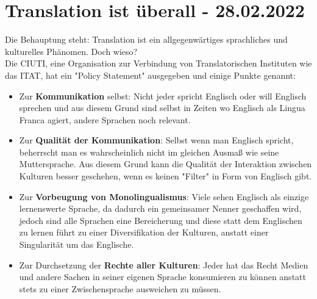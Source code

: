 \documentclass{article}
\begin{document}
	\section{Translation ist überall - 28.02.2022}
	Die Behauptung steht: Translation ist ein allgegenwärtiges sprachliches und kulturelles Phänomen. Doch wieso? \\
	Die CIUTI, eine Organisation zur Verbindung von Translatorischen Instituten wie das ITAT, hat ein "Policy Statement" ausgegeben und einige Punkte genannt:
	\begin{itemize}
		\item{Zur \textbf{Kommunikation} selbst: Nicht jeder spricht Englisch oder will Englisch sprechen und aus diesem Grund sind selbst in Zeiten wo Englisch als Lingua Franca agiert, andere Sprachen noch relevant.}
		\item{Zur \textbf{Qualität der Kommunikation}: Selbst wenn man Englisch spricht, beherrscht man es wahrscheinlich nicht im gleichen Ausmaß wie seine Muttersprache. Aus diesem Grund kann die Qualität der Interaktion zwischen Kulturen besser geschehen, wenn es keinen "Filter" in Form von Englisch gibt.}
		\item{Zur \textbf{Vorbeugung von Monolingualismus}: Viele sehen Englisch als einzige lernenswerte Sprache, da dadurch ein gemeinsamer Nenner geschaffen wird, jedoch sind alle Sprachen eine Bereicherung und diese statt dem Englischen zu lernen führt zu einer Diversifikation der Kulturen, anstatt einer Singularität um das Englische.}
		\item{Zur Durchsetzung der \textbf{Rechte aller Kulturen}: Jeder hat das Recht Medien und andere Sachen in seiner eigenen Sprache konsumieren zu können anstatt stets zu einer Zwischensprache ausweichen zu müssen.}
	\end{itemize}
\end{document}
